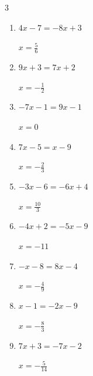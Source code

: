 \begin{multicols}{3}
\begin{enumerate}
  \item $4x-7=-8x+3$

        $\displaystyle x=\frac{5}{6}$

  \item $9x+3=7x+2$

        $\displaystyle x=-\frac{1}{2}$

  \item $-7x-1=9x-1$

        $\displaystyle x=0$

  \item $7x-5=x-9$

        $\displaystyle x=-\frac{2}{3}$

  \item $-3x-6=-6x+4$

        $\displaystyle x=\frac{10}{3}$

  \item $-4x+2=-5x-9$

        $\displaystyle x=-11$

  \item $-x-8=8x-4$

        $\displaystyle x=-\frac{4}{9}$

  \item $x-1=-2x-9$

        $\displaystyle x=-\frac{8}{3}$

  \item $7x+3=-7x-2$

        $\displaystyle x=-\frac{5}{14}$

\end{enumerate}
\end{multicols}
